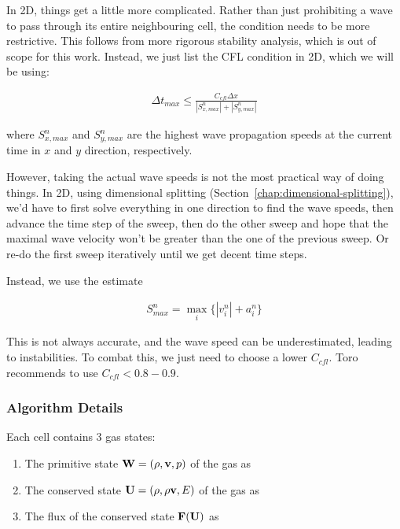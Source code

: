 In 2D, things get a little more complicated. Rather than just prohibiting a
wave to pass through its entire neighbouring cell, the condition needs to be
more restrictive. This follows from more rigorous stability analysis, which is
out of scope for this work. Instead, we just list the CFL condition in 2D,
which we will be using:


\begin{align}
\Delta t_{max} \leq \frac{C_{cfl} \Delta x}{|S_{x,max}^n| + |S_{y,max}^n|}
\label{eq:godunov-cfl-2D}
\end{align}

where $S_{x,max}^n$ and $S_{y,max}^n$ are the highest wave propagation speeds
at the current time in $x$ and $y$ direction, respectively.


However, taking the actual wave speeds is not the most practical way of doing
things.
In 2D, using dimensional splitting (Section~\ref{chap:dimensional-splitting}),
we'd have to first solve everything in one direction to find the wave speeds,
then advance the time step of the sweep, then do the other sweep and hope that
the maximal wave velocity won't be greater than the one of the previous sweep.
Or re-do the first sweep iteratively until we get decent time steps.

Instead, we use the estimate

\begin{align}
	S^n_{max} = \max\limits_i \{ |v_i^n| + a_i^n \}
\end{align}

This is not always accurate, and the wave speed can be underestimated, leading
to instabilities. To combat this, we just need to choose a lower $C_{cfl}$.
Toro recommends to use $C_{cfl} < 0.8 - 0.9$.













\subsubsection{Algorithm Details}\label{chap:godunov-details}

Each cell contains 3 gas states:

\begin{enumerate}
\item The primitive state $\mathbf{W} = (\rho, \mathbf{v}, p)$ of the gas as 
\item The conserved state $\mathbf{U} = (\rho, \rho \mathbf{v}, E)$ of the gas as 
\item The flux of the conserved state $\mathbf{F}(\mathbf{U})$ as 
\end{enumerate}


